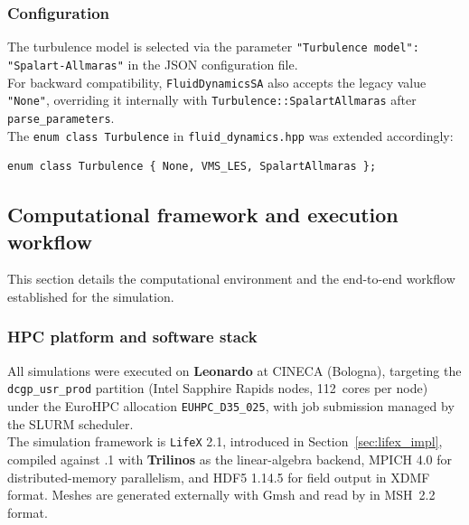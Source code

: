\subsubsection{Configuration}

The turbulence model is selected via the parameter \texttt{"Turbulence model": "Spalart-Allmaras"} in the JSON configuration file.\\

For backward compatibility, \texttt{FluidDynamicsSA} also accepts the legacy value \texttt{"None"}, overriding it internally with \texttt{Turbulence::SpalartAllmaras} after \texttt{parse\_parameters}.\\

The \texttt{enum class Turbulence} in \texttt{fluid\_dynamics.hpp} was extended accordingly:
\begin{lstlisting}[style=cppstyle, caption={Extension of the class \texttt{Turbolence}.}]
enum class Turbulence { None, VMS_LES, SpalartAllmaras };
\end{lstlisting}

\subsection{Computational framework and execution workflow}

This section details the computational environment and the end-to-end workflow established for the simulation.

\subsubsection{HPC platform and software stack}

All simulations were executed on \textbf{Leonardo} at CINECA (Bologna), targeting the \texttt{dcgp\_usr\_prod} partition (Intel Sapphire Rapids nodes, 112~cores per node) under the EuroHPC allocation \texttt{EUHPC\_D35\_025}, with job submission managed by the SLURM scheduler.\\

The simulation framework is \texttt{LifeX} 2.1, introduced in Section~\ref{sec:lifex_impl}, compiled against .1 with \textbf{Trilinos} as the linear-algebra backend, MPICH 4.0 for distributed-memory parallelism, and HDF5 1.14.5 for field output in XDMF format. Meshes are generated externally with Gmsh and read by \textbf{\lifex} in MSH~2.2 format.\\

